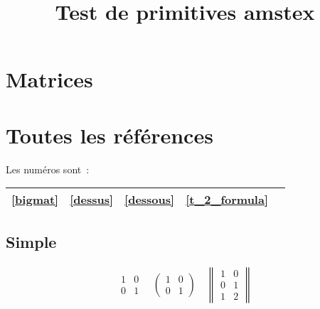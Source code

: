 \documentclass{article}
\title{Test de primitives amstex}
\date{}
\numberwithin{equation}{section}
\begin{document}
\maketitle

\section{Matrices}
\section*{Toutes les r\'ef\'erences}
Les num\'eros sont~:

\begin{tabular}{*{5}{|c}|}\hline
\ref{bigmat} & \ref{dessus} & \ref{dessous} & \ref{t_2_formula}\\ \hline
\end{tabular}

\subsection{Simple}
\begin{gather}
\begin{matrix} 1 & 0\\ 0 & 1\end{matrix}
\quad
\begin{pmatrix} 1 & 0\\ 0 & 1\end{pmatrix}
\quad
\begin{Vmatrix} 1 & 0\\ 0 & 1\\ 1 & 2\end{Vmatrix}
\end{gather}
\end{document}
